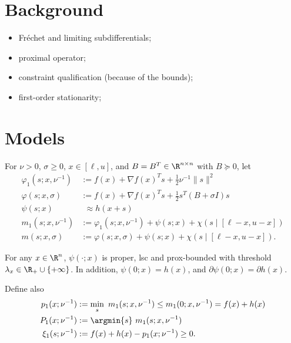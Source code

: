 \documentclass[smallextended]{svjour3}       %
\begin{document}
\section{Background}%
\label{sec:background}

\begin{itemize}
  \item Fréchet and limiting subdifferentials;
  \item proximal operator;
  \item constraint qualification (because of the bounds);
  \item first-order stationarity;
\end{itemize}

\section{Models}%
\label{sec:models}

For \(\nu > 0\), \(\sigma \geq 0\), \(x \in [\ell, u]\), and \(B = B^T \in \R^{n \times n}\) with \(B \succeq 0\), let
\begin{subequations}
  \begin{align}
    \varphi_1(s; x, \nu^{-1}) & := f(x) + \nabla f(x)^T s + \tfrac{1}{2} \nu^{-1} \|s\|^2 \\
    \varphi(s; x, \sigma)     & := f(x) + \nabla f(x)^T s + \tfrac{1}{2} s^T (B + \sigma I) s \\
    \psi(s; x)                & \phantom{:}\approx h(x + s) \\
    m_1(s; x, \nu^{-1})       & := \varphi_1(s; x, \nu^{-1}) + \psi(s; x) + \chi(s \mid [\ell - x, u - x]) \\
    m(s; x, \sigma)           & := \varphi(s; x, \sigma) + \psi(s; x) + \chi(s \mid [\ell - x, u - x]).
  \end{align}
\end{subequations}

\begin{modelassumption}%
  \label{asm:psi}
  For any \(x \in \R^n\), \(\psi(\cdot; x)\) is proper, lsc and prox-bounded with threshold \(\lambda_x \in \R_+ \cup \{+\infty\}\).
  In addition, \(\psi(0; x) = h(x)\), and \(\partial \psi(0; x) = \partial h(x)\).
\end{modelassumption}

Define also
\begin{subequations}
  \begin{align}
    p_1(x; \nu^{-1})   & := \min_s \ m_1(s; x, \nu^{-1}) \leq m_1(0; x, \nu^{-1}) = f(x) + h(x) \\
    P_1(x; \nu^{-1})   & := \argmin{s} \ m_1(s; x, \nu^{-1}) \\
    \xi_1(s; \nu^{-1}) & := f(x) + h(x) - p_1(x; \nu^{-1}) \geq 0. \label{eq:def-xi1}
  \end{align}
\end{subequations}
\end{document}
